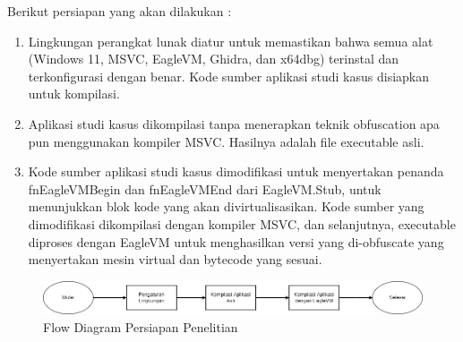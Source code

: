 Berikut persiapan yang akan dilakukan :
\begin{enumerate}
	\item {} Lingkungan perangkat lunak diatur untuk memastikan bahwa semua alat (Windows 11, MSVC, EagleVM, Ghidra, dan x64dbg) terinstal dan terkonfigurasi dengan benar. Kode sumber aplikasi studi kasus disiapkan untuk kompilasi.
	\item {} Aplikasi studi kasus dikompilasi tanpa menerapkan teknik obfuscation apa pun menggunakan kompiler MSVC. Hasilnya adalah file executable asli.
	\item {} Kode sumber aplikasi studi kasus dimodifikasi untuk menyertakan penanda fnEagleVMBegin dan fnEagleVMEnd dari EagleVM.Stub, untuk menunjukkan blok kode yang akan divirtualisasikan. Kode sumber yang dimodifikasi dikompilasi dengan kompiler MSVC, dan selanjutnya, executable diproses dengan EagleVM untuk menghasilkan versi yang di-obfuscate yang menyertakan mesin virtual dan bytecode yang sesuai.
\end{enumerate}

\begin{figure}
	\centering
	\includegraphics[width=1\textwidth]
	{assets/pics/Persiapan.png}
	\caption{Flow Diagram Persiapan Penelitian}
\end{figure}

